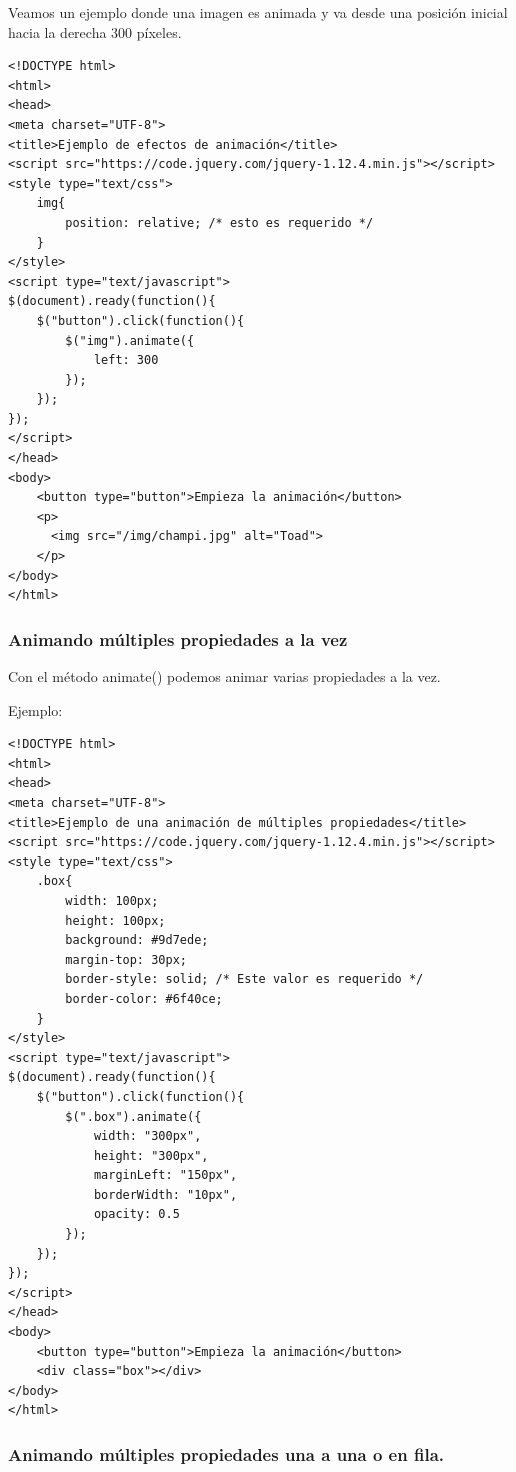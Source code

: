 \documentclass[a4paper, oneside]{article}
\begin{document}
Veamos un ejemplo donde una imagen es animada y va desde una posición inicial hacia la derecha 300 píxeles.

\begin{verbatim}
<!DOCTYPE html>
<html>
<head>
<meta charset="UTF-8">
<title>Ejemplo de efectos de animación</title>
<script src="https://code.jquery.com/jquery-1.12.4.min.js"></script>
<style type="text/css">
    img{
        position: relative; /* esto es requerido */
    }
</style>
<script type="text/javascript">
$(document).ready(function(){
    $("button").click(function(){
        $("img").animate({
            left: 300
        });
    });
});
</script>
</head>
<body>
    <button type="button">Empieza la animación</button>
    <p>
      <img src="/img/champi.jpg" alt="Toad">
    </p>
</body>
</html>                                		
\end{verbatim}

\subsubsection{Animando múltiples propiedades a la vez}
\label{sec:orgb788188}

Con el método animate() podemos animar varias propiedades a la vez.

Ejemplo:

\begin{verbatim}
<!DOCTYPE html>
<html>
<head>
<meta charset="UTF-8">
<title>Ejemplo de una animación de múltiples propiedades</title>
<script src="https://code.jquery.com/jquery-1.12.4.min.js"></script>
<style type="text/css">
    .box{
        width: 100px;
        height: 100px;
        background: #9d7ede;
        margin-top: 30px;
        border-style: solid; /* Este valor es requerido */
        border-color: #6f40ce;
    }
</style>
<script type="text/javascript">
$(document).ready(function(){
    $("button").click(function(){
        $(".box").animate({
            width: "300px",
            height: "300px",
            marginLeft: "150px",
            borderWidth: "10px",
            opacity: 0.5
        });
    });
});
</script>
</head>
<body>
    <button type="button">Empieza la animación</button>
    <div class="box"></div>
</body>
</html>                                		
\end{verbatim}

\subsubsection{Animando múltiples propiedades una a una o en fila.}
\label{sec:orgd1e41da}
\end{document}
